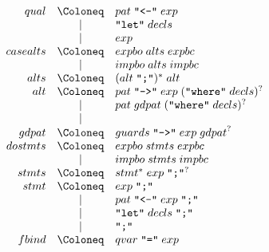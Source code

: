 \begin{align*}
  \begin{array}{rcl}
    {qual}
    & \Coloneq & {pat}\; \text{\texttt{\textquotedbl <-\textquotedbl}}\; {exp} \\
    & \mid & \text{\texttt{\textquotedbl let\textquotedbl}}\; {decls} \\
    & \mid & {exp} \\
    {casealts}
    & \Coloneq & {expbo}\; {alts}\; {expbc} \\
    & \mid & {impbo}\; {alts}\; {impbc} \\
    {alts}
    & \Coloneq & ({alt}\; \text{\texttt{\textquotedbl;\textquotedbl}})^*\; {alt} \\
    {alt}
    & \Coloneq & {pat}\; \text{\texttt{\textquotedbl->\textquotedbl}}\; {exp}\; (\text{\texttt{\textquotedbl where\textquotedbl}}\; {decls})^? \\
    & \mid & {pat}\; {gdpat}\; (\text{\texttt{\textquotedbl where\textquotedbl}}\; {decls})^? \\
    & \mid & \\
    {gdpat}
    & \Coloneq & {guards}\; \text{\texttt{\textquotedbl->\textquotedbl}}\; {exp}\; {gdpat}^? \\
    {dostmts}
    & \Coloneq & {expbo}\; {stmts}\; {expbc} \\
    & \mid & {impbo}\; {stmts}\; {impbc} \\
    {stmts}
    & \Coloneq & {stmt}^*\; {exp}\; \text{\texttt{\textquotedbl;\textquotedbl}}^? \\
    {stmt}
    & \Coloneq & {exp}\; \text{\texttt{\textquotedbl;\textquotedbl}} \\
    & \mid & {pat}\; \text{\texttt{\textquotedbl <-\textquotedbl}}\; {exp}\; \text{\texttt{\textquotedbl;\textquotedbl}} \\
    & \mid & \text{\texttt{\textquotedbl let\textquotedbl}}\; {decls}\; \text{\texttt{\textquotedbl;\textquotedbl}} \\
    & \mid & \text{\texttt{\textquotedbl;\textquotedbl}} \\
    {fbind}
    & \Coloneq & {qvar}\; \text{\texttt{\textquotedbl =\textquotedbl}}\; {exp}
  \end{array}
\end{align*}

